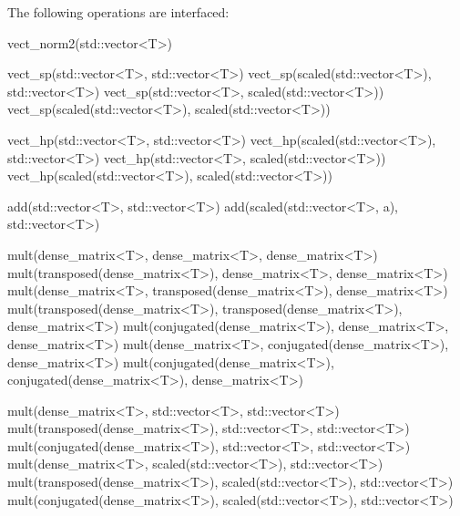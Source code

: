 \documentclass[11pt,a4paper]{article}
\begin{document}
The following operations are interfaced:
\begin{cppcode}
  vect_norm2(std::vector<T>)                                           
                                                                        
  vect_sp(std::vector<T>, std::vector<T>)                               
  vect_sp(scaled(std::vector<T>), std::vector<T>)                       
  vect_sp(std::vector<T>, scaled(std::vector<T>))                       
  vect_sp(scaled(std::vector<T>), scaled(std::vector<T>))               
                                                                        
  vect_hp(std::vector<T>, std::vector<T>)                               
  vect_hp(scaled(std::vector<T>), std::vector<T>)                       
  vect_hp(std::vector<T>, scaled(std::vector<T>))                       
  vect_hp(scaled(std::vector<T>), scaled(std::vector<T>))               
                                                                        
  add(std::vector<T>, std::vector<T>)                                   
  add(scaled(std::vector<T>, a), std::vector<T>)                         

  mult(dense_matrix<T>, dense_matrix<T>, dense_matrix<T>)               
  mult(transposed(dense_matrix<T>), dense_matrix<T>, dense_matrix<T>)   
  mult(dense_matrix<T>, transposed(dense_matrix<T>), dense_matrix<T>)   
  mult(transposed(dense_matrix<T>), transposed(dense_matrix<T>),        
       dense_matrix<T>)                                                 
  mult(conjugated(dense_matrix<T>), dense_matrix<T>, dense_matrix<T>)   
  mult(dense_matrix<T>, conjugated(dense_matrix<T>), dense_matrix<T>)   
  mult(conjugated(dense_matrix<T>), conjugated(dense_matrix<T>),        
       dense_matrix<T>)                                                 
                                                                        
  mult(dense_matrix<T>, std::vector<T>, std::vector<T>)                 
  mult(transposed(dense_matrix<T>), std::vector<T>, std::vector<T>)     
  mult(conjugated(dense_matrix<T>), std::vector<T>, std::vector<T>)     
  mult(dense_matrix<T>, scaled(std::vector<T>), std::vector<T>)         
  mult(transposed(dense_matrix<T>), scaled(std::vector<T>),             
       std::vector<T>)                                                  
  mult(conjugated(dense_matrix<T>), scaled(std::vector<T>),             
       std::vector<T>)


\end{cppcode}
\end{document}

